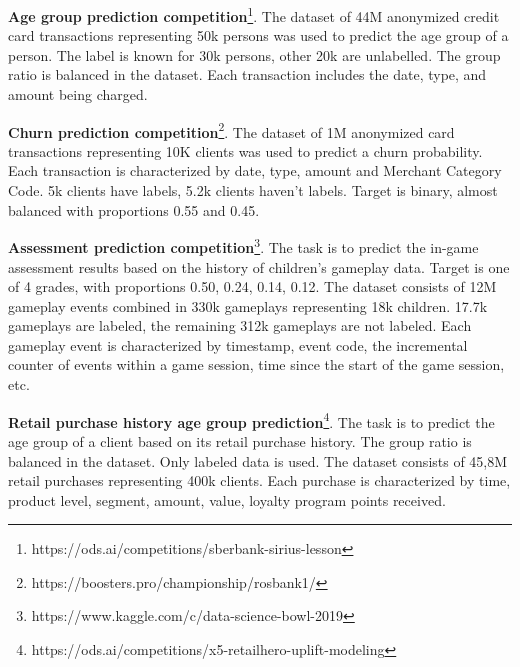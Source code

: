 \documentclass[sigconf, anonymous]{acmart}
\begin{document}
\textbf{Age group prediction competition}\footnote{https://ods.ai/competitions/sberbank-sirius-lesson}. The dataset of 44M an\-onymized credit card transactions representing 50k persons was used to predict the age group of a person. The label is known for 30k persons, other 20k are unlabelled. The group ratio is balanced in the dataset. Each transaction includes the date, type, and amount being charged.


\textbf{Churn prediction competition}\footnote{https://boosters.pro/championship/rosbank1/}. The dataset of 1M an\-onymiz\-ed card transactions representing 10K clients was used to predict a churn probability. Each transaction is characterized by date, type, amount and Merchant Category Code. 5k clients have labels, 5.2k clients haven't labels. Target is binary, almost balanced with proportions 0.55 and 0.45.

\textbf{Assessment prediction competition}\footnote{https://www.kaggle.com/c/data-science-bowl-2019}.  The task is to predict the in-game assessment results based on the history of children's gameplay data. Target is one of 4 grades, with proportions 0.50, 0.24, 0.14, 0.12. The dataset consists of 12M gameplay events combined in 330k gameplays representing 18k children. 17.7k gameplays are labeled, the remaining 312k gameplays are not labeled. Each gameplay event is characterized by timestamp, event code, the incremental counter of events within a game session, time since the start of the game session, etc.

\textbf{Retail purchase history age group prediction}\footnote{https://ods.ai/competitions/x5-retailhero-uplift-modeling}. The task is to predict the age group of a client based on its retail purchase history. The group ratio is balanced in the dataset. Only labeled data is used. The dataset consists of 45,8M retail purchases representing 400k clients. Each purchase is characterized by time, product level, segment, amount, value, loyalty program points received.

\end{document}
